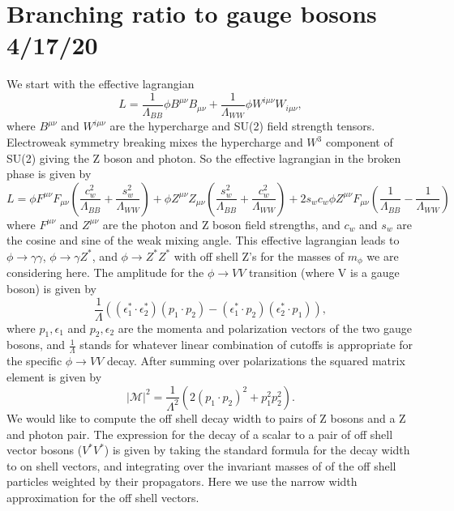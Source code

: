 \documentclass[aps,onecolumn,twoside,secnumarabic,balancelastpage,amsmath,amssymb,nofootinbib,hyperref=pdftex]{revtex4}
\begin{document}
\section{Branching ratio to gauge bosons \tiny{4/17/20}}
We start with the effective lagrangian
\begin{equation}
L =  \frac{1}{\Lambda_{BB}}\phi B^{\mu\nu}B_{\mu\nu} + \frac{1}{\Lambda_{WW}}\phi W^{i\mu\nu}W_{i\mu\nu},
\end{equation}
where $B^{\mu\nu}$ and $W^{i\mu\nu}$ are the hypercharge and SU(2) field strength tensors. Electroweak symmetry breaking mixes the hypercharge and $W^{3}$ component of SU(2) giving the Z boson and photon. So the effective lagrangian in the broken phase is given by
\begin{equation}
L = \phi F^{\mu\nu}F_{\mu\nu}(\frac{c_{w}^{2}}{\Lambda_{BB}} + \frac{s_{w}^{2}}{\Lambda_{WW}}) + \phi Z^{\mu\nu}Z_{\mu\nu}(\frac{s_{w}^{2}}{\Lambda_{BB}} + \frac{c_{w}^{2}}{\Lambda_{WW}}) + 2s_{w}c_{w}\phi Z^{\mu\nu}F_{\mu\nu}(\frac{1}{\Lambda_{BB}} - \frac{1}{\Lambda_{WW}})
\end{equation}
where $F^{\mu\nu}$ and $Z^{\mu\nu}$ are the photon and Z boson field strengths, and $c_{w}$ and $s_{w}$ are the cosine and sine of the weak mixing angle. This effective lagrangian leads to $\phi\rightarrow\gamma\gamma$, $\phi\rightarrow\gamma Z^{*}$, and $\phi\rightarrow Z^{*} Z^{*}$ with off shell Z's for the masses of $m_{\phi}$ we are considering here. The amplitude for the $\phi\rightarrow VV$ transition (where V is a gauge boson) is given by
\begin{equation}
\frac{1}{\Lambda}((\epsilon^{*}_{1}\cdot\epsilon^{*}_{2})(p_{1}\cdot p_{2}) - (\epsilon^{*}_{1}\cdot p_{2})(\epsilon^{*}_{2}\cdot p_{1})),
\end{equation} 
where $p_{1}, \epsilon_{1}$ and $p_{2}, \epsilon_{2}$ are the momenta and polarization vectors of the two gauge bosons, and $\frac{1}{\Lambda}$ stands for whatever linear combination of cutoffs is appropriate for the specific $\phi\rightarrow VV$ decay. After summing over polarizations the squared matrix element is given by
\begin{equation}
|\mathcal{M}|^{2} = \frac{1}{\Lambda^{2}}(2(p_{1}\cdot p_{2})^{2} + p_{1}^{2}p_{2}^{2}).
\label{eq:7}
\end{equation}
\vskip 0.12in
We would like to compute the off shell decay width to pairs of Z bosons and a Z and photon pair. The expression for the decay of a scalar to a pair of off shell vector bosons ($V^{*}V^{*}$) \cite{Djouadi:1995gv} is given by taking the standard formula for the decay width to on shell vectors, and integrating over the invariant masses of of the off shell particles weighted by their propagators. Here we use the narrow width approximation \cite{Uhlemann:2008pm} for the off shell vectors.
\end{document}
